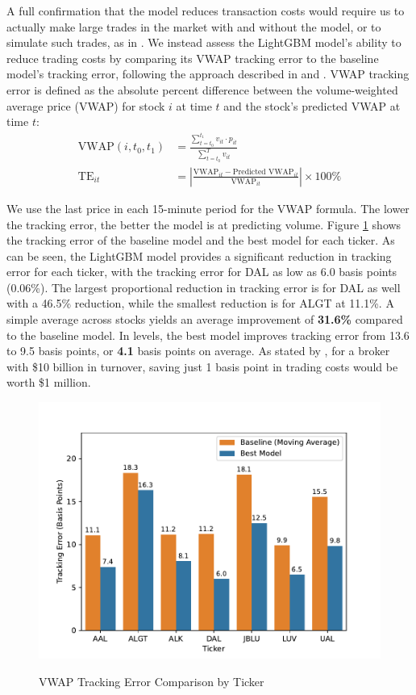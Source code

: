 \documentclass[12pt]{article}
\begin{document}
A full confirmation that the model reduces transaction costs would require us to actually make large trades in the market with and without the model, or to simulate such trades, as in \textcite{satish2014predicting}. We instead assess the LightGBM model's ability to reduce trading costs by comparing its VWAP tracking error to the baseline model's tracking error, following the approach described in \textcite{chen2016forecasting} and \textcite{cucuringu2025forecasting}. VWAP tracking error is defined as the absolute percent difference between the volume-weighted average price (VWAP) for stock $i$ at time $t$ and the stock's predicted VWAP at time $t$:
\begin{align}
    \text{VWAP}(i,t_0,t_1) &= \frac{\sum_{t=t_0}^{t_1} v_{it} \cdot p_{it}}{\sum_{t=t_0}^T v_{it}} \\
    \text{TE}_{it} &= \left| \frac{\text{VWAP}_{it} - \text{Predicted VWAP}_{it}}{\text{VWAP}_{it}} \right| \times 100\%
\end{align}

We use the last price in each 15-minute period for the VWAP formula. The lower the tracking error, the better the model is at predicting volume. Figure \ref{fig:vwap_tracking_error} shows the tracking error of the baseline model and the best model for each ticker. As can be seen, the LightGBM model provides a significant reduction in tracking error for each ticker, with the tracking error for DAL as low as 6.0 basis points (0.06\%). The largest proportional reduction in tracking error is for DAL as well with a 46.5\% reduction, while the smallest reduction is for ALGT at 11.1\%. A simple average across stocks yields an average improvement of \textbf{31.6\%} compared to the baseline model. In levels, the best model improves tracking error from 13.6 to 9.5 basis points, or \textbf{4.1} basis points on average. As stated by \textcite{chen2016forecasting}, for a broker with \$10 billion in turnover, saving just 1 basis point in trading costs would be worth \$1 million. 

\begin{figure}[H]
    \centering
    \caption{VWAP Tracking Error Comparison by Ticker}
    \includegraphics[width=0.85\linewidth]{../Output/vwap_compare.pdf}
    \label{fig:vwap_tracking_error}
\end{figure}
\end{document}
